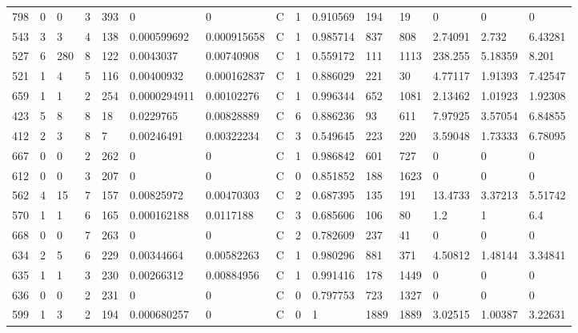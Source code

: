 \begin{latin}
\begin{longtable}{lllllllllllllll}
	798 & 0  & 0   & 3  & 393 & 0              & 0              & C & 1  & 0.910569 & 194  & 19   & 0       & 0       & 0       \\
	543 & 3  & 3   & 4  & 138 & 0.000599692    & 0.000915658    & C & 1  & 0.985714 & 837  & 808  & 2.74091 & 2.732   & 6.43281 \\
	527 & 6  & 280 & 8  & 122 & 0.0043037      & 0.00740908     & C & 1  & 0.559172 & 111  & 1113 & 238.255 & 5.18359 & 8.201   \\
	521 & 1  & 4   & 5  & 116 & 0.00400932     & 0.000162837    & C & 1  & 0.886029 & 221  & 30   & 4.77117 & 1.91393 & 7.42547 \\
	659 & 1  & 1   & 2  & 254 & 0.0000294911   & 0.00102276     & C & 1  & 0.996344 & 652  & 1081 & 2.13462 & 1.01923 & 1.92308 \\
	423 & 5  & 8   & 8  & 18  & 0.0229765      & 0.00828889     & C & 6  & 0.886236 & 93   & 611  & 7.97925 & 3.57054 & 6.84855 \\
	412 & 2  & 3   & 8  & 7   & 0.00246491     & 0.00322234     & C & 3  & 0.549645 & 223  & 220  & 3.59048 & 1.73333 & 6.78095 \\
	667 & 0  & 0   & 2  & 262 & 0              & 0              & C & 1  & 0.986842 & 601  & 727  & 0       & 0       & 0       \\
	612 & 0  & 0   & 3  & 207 & 0              & 0              & C & 0  & 0.851852 & 188  & 1623 & 0       & 0       & 0       \\
	562 & 4  & 15  & 7  & 157 & 0.00825972     & 0.00470303     & C & 2  & 0.687395 & 135  & 191  & 13.4733 & 3.37213 & 5.51742 \\
	570 & 1  & 1   & 6  & 165 & 0.000162188    & 0.0117188      & C & 3  & 0.685606 & 106  & 80   & 1.2     & 1       & 6.4     \\
	668 & 0  & 0   & 7  & 263 & 0              & 0              & C & 2  & 0.782609 & 237  & 41   & 0       & 0       & 0       \\
	634 & 2  & 5   & 6  & 229 & 0.00344664     & 0.00582263     & C & 1  & 0.980296 & 881  & 371  & 4.50812 & 1.48144 & 3.34841 \\
	635 & 1  & 1   & 3  & 230 & 0.00266312     & 0.00884956     & C & 1  & 0.991416 & 178  & 1449 & 0       & 0       & 0       \\
	636 & 0  & 0   & 2  & 231 & 0              & 0              & C & 0  & 0.797753 & 723  & 1327 & 0       & 0       & 0       \\
	599 & 1  & 3   & 2  & 194 & 0.000680257    & 0              & C & 0  & 1        & 1889 & 1889 & 3.02515 & 1.00387 & 3.22631 \\

\end{longtable}
\end{latin}
